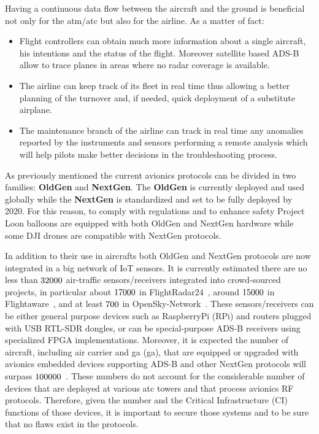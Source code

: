 \documentclass[../main.tex]{subfiles}
\begin{document}
Having a continuous data flow between the aircraft and the ground is beneficial not only for the \acrshort{atm}/\acrshort{atc} but also for the airline. As a matter of fact:
\begin{itemize}
  \item Flight controllers can obtain much more information about a single aircraft, his intentions and the status of the flight. Moreover satellite based ADS-B allow to trace planes in areas where no radar coverage is available.
  \item The airline can keep track of its fleet in real time thus allowing a better planning of the turnover and, if needed, quick deployment of a substitute airplane.
  \item The maintenance branch of the airline can track in real time any anomalies reported by the instruments and sensors performing a remote analysis which will help pilots make better decisions in the troubleshooting process.
\end{itemize}

As previously mentioned the current avionics protocols can be divided in two families: \textbf{OldGen} and \textbf{NextGen}. The \textbf{OldGen} is currently deployed and used globally while the \textbf{NextGen} is standardized and set to be fully deployed by 2020. For this reason, to comply with regulations and to enhance safety Project Loon balloons are equipped with both OldGen and NextGen hardware\cite{loonadsb} while some DJI drones are compatible with NextGen protocols\cite{dji}.

In addition to their use in aircrafts both OldGen and NextGen protocols are now integrated in a big network of IoT sensors. It is currently estimated there are no less than $32000$ air-traffic sensors/receivers integrated into crowd-sourced projects, in particular about $17000$ in FlightRadar24~\cite{countFRadar}, around $15000$ in Flightaware~\cite{countFAware}, and at least $700$ in OpenSky-Network~\cite{schafer2017opensky}. These sensors/receivers can be either general purpose devices such as RaspberryPi (RPi) and routers plugged with USB RTL-SDR dongles, or can be special-purpose ADS-B receivers using specialized FPGA implementations.
%
Moreover, it is expected the number of aircraft, including air carrier and \acrlong{ga} (\acrshort{ga}), that are equipped or upgraded with avionics embedded devices supporting ADS-B and other NextGen protocols will surpass $100000$~\cite{countFAA}.
These numbers do not account for the considerable number of devices that are deployed at various \acrshort{atc} towers and that process avionics RF protocols. Therefore, given the number and the Critical Infrastructure (CI) functions of those devices, it is important to secure those systems and to be sure that no flaws exist in the protocols.
\end{document}
